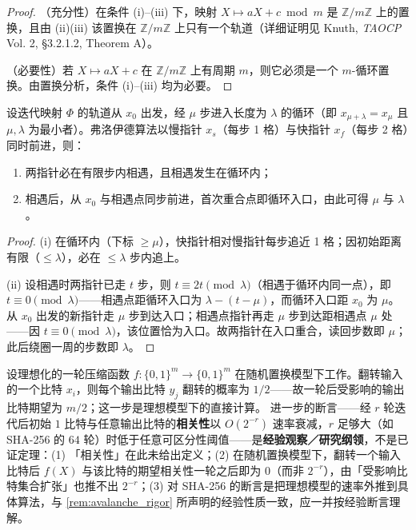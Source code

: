 \begin{proof}
（充分性）在条件 (i)–(iii) 下，映射 $X \mapsto aX + c \bmod m$ 是 $\mathbb Z/m\mathbb Z$ 上的置换，且由 (ii)(iii) 该置换在 $\mathbb Z/m\mathbb Z$ 上只有一个轨道（详细证明见 Knuth, \textit{TAOCP} Vol. 2, \S{}3.2.1.2, Theorem A）。

（必要性）若 $X \mapsto aX+c$ 在 $\mathbb Z/m\mathbb Z$ 上有周期 $m$，则它必须是一个 $m$-循环置换。由置换分析，条件 (i)–(iii) 均为必要。
\end{proof}

\begin{lemma}[弗洛伊德判圈算法的正确性]\label{ch33_floyd_cycle}
设迭代映射 $\Phi$ 的轨道从 $x_0$ 出发，经 $\mu$ 步进入长度为 $\lambda$ 的循环（即 $x_{\mu+\lambda} = x_\mu$ 且 $\mu, \lambda$ 为最小者）。弗洛伊德算法以慢指针 $x_s$（每步 1 格）与快指针 $x_f$（每步 2 格）同时前进，则：
\begin{enumerate}[label=(\roman*)]
    \item 两指针必在有限步内相遇，且相遇发生在循环内；
    \item 相遇后，从 $x_0$ 与相遇点同步前进，首次重合点即循环入口，由此可得 $\mu$ 与 $\lambda$。
\end{enumerate}
\end{lemma}

\begin{proof}
(i) 在循环内（下标 $\ge \mu$），快指针相对慢指针每步追近 1 格；因初始距离有限（$\le \lambda$），必在 $\le \lambda$ 步内追上。

(ii) 设相遇时两指针已走 $t$ 步，则 $t \equiv 2t \pmod \lambda$（相遇于循环内同一点），即 $t \equiv 0 \pmod{\lambda}$——相遇点距循环入口为 $\lambda - (t - \mu)$，而循环入口距 $x_0$ 为 $\mu$。从 $x_0$ 出发的新指针走 $\mu$ 步到达入口；相遇点指针再走 $\mu$ 步到达距相遇点 $\mu$ 处——因 $t \equiv 0 \pmod \lambda$，该位置恰为入口。故两指针在入口重合，读回步数即 $\mu$；此后绕圈一周的步数即 $\lambda$。
\end{proof}

\begin{remark}\label{prop:avalanche_effect}
设理想化的一轮压缩函数 $f: \{0,1\}^m \to \{0,1\}^m$ 在随机置换模型下工作。翻转输入的一个比特 $x_i$，则每个输出比特 $y_j$ 翻转的概率为 $1/2$——故一轮后受影响的输出比特期望为 $m/2$；这一步是理想模型下的直接计算。
进一步的断言——经 $r$ 轮迭代后初始 $1$ 比特与任意输出比特的\textbf{相关性}以 $O(2^{-r})$ 速率衰减，$r$ 足够大（如 SHA-256 的 $64$ 轮）时低于任意可区分性阈值——是\textbf{经验观察／研究纲领}，不是已证定理：(1) 「相关性」在此未给出定义；(2) 在随机置换模型下，翻转一个输入比特后 $f(X)$ 与该比特的期望相关性一轮之后即为 $0$（而非 $2^{-r}$），由「受影响比特集合扩张」也推不出 $2^{-r}$；(3) 对 SHA-256 的断言是把理想模型的速率外推到具体算法，与 \cref{rem:avalanche_rigor} 所声明的经验性质一致，应一并按经验断言理解。
\end{remark}

